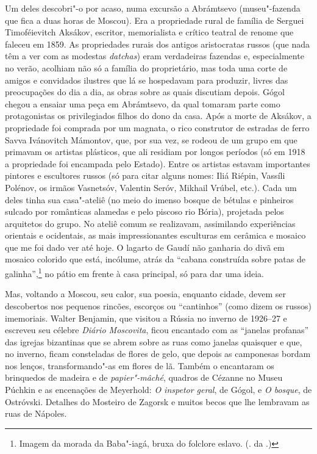 Um deles descobri"-o por acaso, numa excursão a Abrámtsevo (museu"-fazenda que fica a duas horas de Moscou). Era a propriedade rural de família de Serguei Timoféievitch Aksákov, escritor, memorialista e crítico teatral de renome que faleceu em 1859. As propriedades rurais dos antigos aristocratas russos (que nada têm a ver com as modestas \emph{datchas}) eram verdadeiras fazendas e, especialmente no verão, acolhiam não só a família do proprietário, mas toda uma corte de amigos e convidados ilustres que lá se hospedavam para produzir, livres das preocupações do dia a dia, as obras sobre as quais discutiam depois. Gógol chegou a ensaiar uma peça em Abrámtsevo, da qual tomaram parte como protagonistas os privilegiados filhos do dono da casa. Após a morte de Aksákov, a propriedade foi comprada por um magnata, o rico construtor de estradas de ferro Savva Ivánovitch Mámontov, que, por sua vez, se rodeou de um grupo em que primavam os artistas plásticos, que ali residiam por longos períodos (só em 1918 a propriedade foi encampada pelo Estado). Entre os artistas estavam importantes pintores e escultores russos (só para citar alguns nomes: Iliá Riépin, Vassíli Polénov, os irmãos Vasnetsóv, Valentin Seróv, Mikhail Vrúbel, etc.). Cada um deles tinha sua casa"-ateliê (no meio do imenso bosque de bétulas e pinheiros sulcado por românticas alamedas e pelo piscoso rio Bória), projetada pelos arquitetos do grupo. No ateliê comum se realizavam, assimilando experiências orientais e ocidentais, as mais impressionantes esculturas em cerâmica e mosaico que me foi dado ver até hoje. O lagarto de Gaudí não ganharia do divã em mosaico colorido que está, incólume, atrás da ``cabana construída sobre patas de galinha'',\footnote{Imagem da morada da Baba"-iagá, bruxa do folclore eslavo. (. da .)} no pátio em frente à casa principal, só para dar uma ideia.

Mas, voltando a Moscou, seu calor, sua poesia, enquanto cidade, devem ser descobertos nos pequenos rincões, escorços ou ``cantinhos'' (como dizem os russos) imemoriais. Walter Benjamin, que visitou a Rússia no inverno de 1926--27 e escreveu seu célebre \emph{Diário Moscovita}, ficou encantado com as ``janelas profanas'' das igrejas bizantinas que se abrem sobre as ruas como janelas quaisquer e que, no inverno, ficam consteladas de flores de gelo, que depois as camponesas bordam nos lenços, transformando"-as em flores de lã. Também o encantaram os brinquedos de madeira e de \emph{papier"-mâché}, quadros de Cézanne no Museu Púchkin e as encenações de Meyerhold: \emph{O inspetor geral}, de Gógol, e \emph{O bosque}, de Ostróvski. Detalhes do Mosteiro de Zagorsk e muitos becos que lhe lembravam as ruas de Nápoles.

